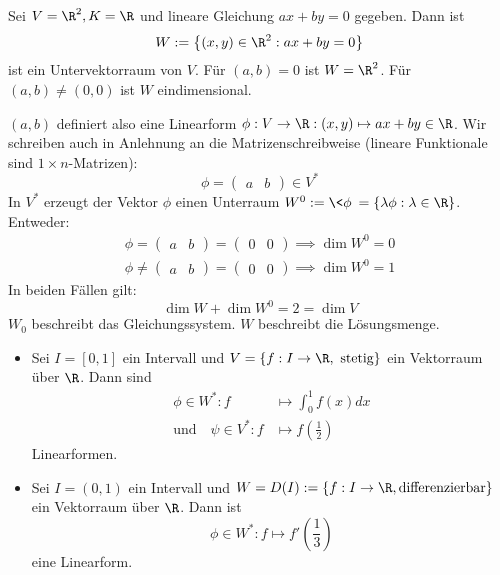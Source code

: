 \documentclass[a4paper, 10pt]{scrbook}
\begin{document}
\begin{ex}
Sei $V=\R^2, K=\R$ und lineare Gleichung $ax+by=0$ gegeben.
Dann ist
\[
W:=\left\{(x, y) \in \R^2:ax+by=0\right\}
\]
ist ein Untervektorraum von $V$. 
Für $(a,b)=0$ ist $W=\R^2$.
Für $(a,b)\neq (0,0)$ ist $W$ eindimensional.

$(a,b)$ definiert also eine Linearform $\phi:V\to\R:(x,y)\mapsto ax+by\in\R$.
Wir schreiben auch in Anlehnung an die Matrizenschreibweise (lineare Funktionale sind $1\times n$-Matrizen):
\[
	\phi=\begin{pmatrix}a&b\end{pmatrix}\in V^*
\]
In $V^*$ erzeugt der Vektor $\phi$ einen Unterraum $W^0:=\<\phi\>=\{\lambda\phi:\lambda\in\R\}$.
Entweder:
\begin{align*}
	\phi=\begin{pmatrix}a&b\end{pmatrix}=\begin{pmatrix}0&0\end{pmatrix} \implies \dim W^0=0\\
\phi\neq \begin{pmatrix}a&b\end{pmatrix}=\begin{pmatrix}0&0\end{pmatrix}\implies \dim W^0=1
\end{align*}
In beiden Fällen gilt: 
\[
	\dim W +\dim W^0 =2=\dim V
\]
$W_0$ beschreibt das Gleichungssystem. 
$W$ beschreibt die Lösungsmenge.
\end{ex}
\begin{ex}
\begin{itemize}
\item
Sei $I=[0,1]$ ein Intervall und $V=\{f:I\to\R, \text{ stetig}\}$ ein Vektorraum über $\R$.
Dann sind
\begin{align*}
	\phi\in W^*:f &\mapsto \int_0^1f(x)dx\\
	\text{und}\quad \psi\in V^*:f&\mapsto f\left(\frac 12\right)
\end{align*}
Linearformen.
\item
Sei $I=(0,1)$ ein Intervall und $W=D(I):=\{f:I\to\R, \text{differenzierbar}\}$ ein Vektorraum über $\R$.
Dann ist
\[
	\phi\in W^*:f\mapsto f'\left(\frac 13\right)
\]
eine Linearform.
\end{itemize}
\end{ex}
\end{document}
